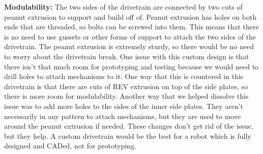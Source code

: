 \par \textbf{Modulability:} The two sides of the drivetrain are connected by two cuts of peanut extrusion to support and build off of. Peanut extrusion has holes on both ends that are threaded, so bolts can be screwed into them. This means that there is no need to use gussets or other forms of support to attach the two sides of the drivetrain. The peanut extrusion is extremely sturdy, so there would be no need to worry about the drivetrain break. One issue with this custom design is that there isn't that much room for prototyping and testing because we would need to drill holes to attach mechanisms to it. One way that this is countered in this drivetrain is that there are cuts of REV extrusion on top of the side plates, so there is more room for modulability. Another way that we helped dissolve this issue was to add more holes to the sides of the inner side plates. They aren't necessarily in any pattern to attach mechanisms, but they are used to move around the peanut extrusion if needed. These changes don't get rid of the issue, but they help. A custom drivetrain would be the best for a robot which is fully designed and CADed, not for prototyping.
\\
\newpage
{}
\newpage
